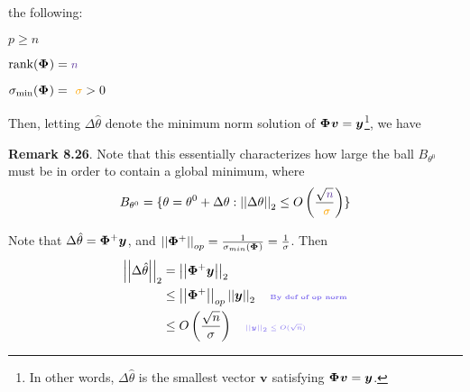 \documentclass[11pt]{article}
\renewcommand\vec[2][]{\bm{#2}_{#1}}
\begin{document}
\begin{definition}
	 the following: 
	\begin{compactitem}
		\item $p \geq n$
		\item $\text{rank}(\matr\Phi) = \mpurple n$ 
		\item $\sigma_{\text{min}}(\matr\Phi) = \morange{\sigma} > 0$
	\end{compactitem}

	Then, letting $\Delta \hat\theta$ denote the minimum norm solution of $\matr \Phi \vec v = \vec y$\footnote{In other words, $\Delta\hat\theta$ is the smallest vector $\vec v$ satisfying $\matr\Phi \vec v = \vec y$.}, we have 

	\textbf{Remark 8.26}. Note that this essentially characterizes how large the ball $B_{\theta^0}$ must be in order to contain a global minimum, where
	\begin{align}
		B_{\theta^0} = \{ \theta = \theta^0 + \Delta\theta : \norm{\Delta\theta} \leq   O\lr{ \frac{\sqrt{\mpurple n}}{\morange{\sigma}} }  \}
	\end{align}

	\begin{example}[Proof]
		Note that $\Delta\hat\theta = \matr\Phi^{+} \vec y $, and $\norm[op]{\matr\Phi^+} = \inv{\sigma_{min}(\matr\Phi)} = \inv{\sigma}$. Then
		\begin{align}
			\norm{\Delta\hat\theta}
				&= \norm{\matr\Phi^{+} \vec y} \\
				&\leq \norm[op]{\matr\Phi^{+}} \norm{\vec y} \quad \mtblue{\tiny By def of op norm} \\
				&\leq O\lr{ \frac{\sqrt{n}}{\sigma} } \quad \mtblue{\tiny $\norm{\vec y} \leq O(\sqrt n)$}
		\end{align}
	\end{example}

\end{definition}
\end{document}
